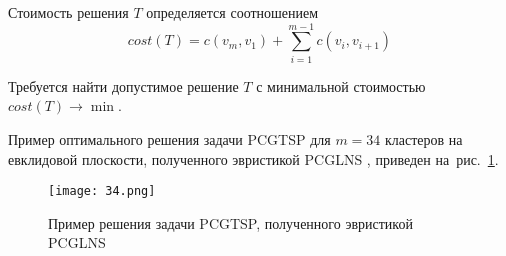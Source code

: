 Стоимость решения $T$ определяется соотношением
$$
	cost(T) = c(v_m,v_1) + \sum_{i=1}^{m-1} c(v_i,v_{i+1})
$$

Требуется найти допустимое решение
$ T $
с минимальной стоимостью $ cost (T) \to \min$.

Пример оптимального решения задачи
PCGTSP
для $m=34$ кластеров
на евклидовой плоскости,
полученного эвристикой
PCGLNS
\cite{KKP-optima2020},
приведен на~рис.~\ref{fig:pcgtsp.svg}.

\begin{figure}
  \centering
  \texttt{[image: 34.png]}
  \caption{Пример решения задачи PCGTSP, полученного эвристикой PCGLNS}
  \label{fig:pcgtsp.svg}
\end{figure}
